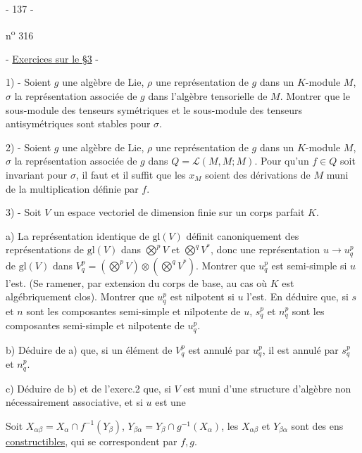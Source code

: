 \begin{center}- 137 -\end{center}
\hfill n\textsuperscript{o} 316
\begin{center}- \uline{Exercices sur le §3} -\end{center}

1) - Soient $g$ une algèbre de Lie, $\rho$ une représentation de $g$ dans un $K$-module $M$, $\sigma$ la représentation associée de $g$ dans l'algèbre tensorielle de $M$. Montrer que le sous-module des tenseurs symétriques et le sous-module des tenseurs antisymétriques sont stables pour $\sigma$.

2) - Soient $g$ une algèbre de Lie, $\rho$ une représentation de $g$ dans un $K$-module $M$, $\sigma$ la représentation associée de $g$ dans $Q=\mathcal L(M,M;M)$. Pour qu'un $f\in Q$ soit invariant pour $\sigma$, il faut et il suffit que les $x_M$ soient des dérivations de $M$ muni de la multiplication définie par $f$.

3) - Soit $V$ un espace vectoriel de dimension finie sur un corps parfait $K$.

a) La représentation identique de $\mathrm{gl}(V)$ définit canoniquement des représentations de $\mathrm{gl}(V)$ dans $\overset{p}{\bigotimes}V$ et $\overset{q}{\bigotimes}V^*$, donc une représentation $u\longrightarrow u_q^p$ de $\mathrm{gl}(V)$ dans $V_q^p=(\overset{p}{\bigotimes}V)\otimes(\overset{q}{\bigotimes}V^*)$. Montrer que $u_q^p$ est semi-simple si $u$ l'est. (Se ramener, par extension du corps de base, au cas où $K$ est algébriquement clos). Montrer que $u_q^p$ est nilpotent si $u$ l'est. En déduire que, si $s$ et $n$ sont les composantes semi-simple et nilpotente de $u$, $s_q^p$ et $n_q^p$ sont les composantes semi-simple et nilpotente de $u_q^p$.

b) Déduire de a) que, si un élément de $V_q^p$ est annulé par $u_q^p$, il est annulé par $s_q^p$ et $n_q^p$.

c) Déduire de b) et de l'exerc.2 que, si $V$ est muni d'une structure d'algèbre non nécessairement associative, et si $u$ est une

Soit $X_{\alpha\beta}=X_\alpha\cap f^{-1}(Y_\beta)$, $Y_{\beta\alpha}=Y_\beta\cap g^{-1}(X_\alpha)$, les $X_{\alpha\beta}$ et $Y_{\beta\alpha}$ sont des ens \uline{constructibles}, qui se correspondent par $f,g$.


